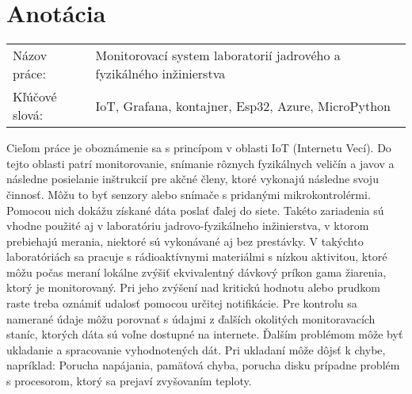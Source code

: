 \documentclass[../main.tex]{subfiles} %
\begin{document}
\newpage
\vspace*{6cm}
\section*{Anotácia}


\noindent

\begingroup
\setlength{\tabcolsep}{12pt} %
\renewcommand{\arraystretch}{1.3} %
\begin{table}[h!]
\begin{tabular}{ l l  }
Názov práce: &  Monitorovací system laboratorií jadrového a fyzikálného inžinierstva  \\
Kľúčové slová:  &  IoT, Grafana, kontajner, Esp32, Azure, MicroPython \\
\end{tabular}
\end{table}
\endgroup

Cieľom práce je oboznámenie sa s princípom v oblasti IoT (Internetu Vecí). Do tejto oblasti patrí monitorovanie, snímanie rôznych fyzikálnych veličín a javov a následne posielanie inštrukcií pre akčné členy, ktoré vykonajú následne svoju činnosť. Môžu to byť senzory alebo snímače s pridanými mikrokontrolérmi. Pomocou nich dokážu získané dáta poslať ďalej do siete. Takéto zariadenia sú vhodne použité aj v laboratóriu jadrovo-fyzikálneho inžinierstva, v ktorom prebiehajú merania, niektoré sú vykonávané aj bez prestávky. V takýchto laboratóriách sa pracuje s rádioaktívnymi materiálmi s nízkou aktivitou, ktoré môžu počas meraní lokálne zvýšiť ekvivalentný dávkový príkon gama žiarenia, ktorý je monitorovaný. Pri jeho zvýšení nad kritickú hodnotu alebo prudkom raste treba oznámiť udalosť pomocou určitej notifikácie. Pre kontrolu sa namerané údaje môžu porovnať s údajmi z ďalších okolitých monitoravacích staníc, ktorých dáta sú voľne dostupné na internete.  Ďalším problémom môže byť ukladanie a spracovanie vyhodnotených dát. Pri ukladaní môže dôjsť k chybe, napríklad: Porucha napájania, pamäťová chyba, porucha disku prípadne problém s procesorom, ktorý sa prejaví zvyšovaním teploty.

    
\end{document}
